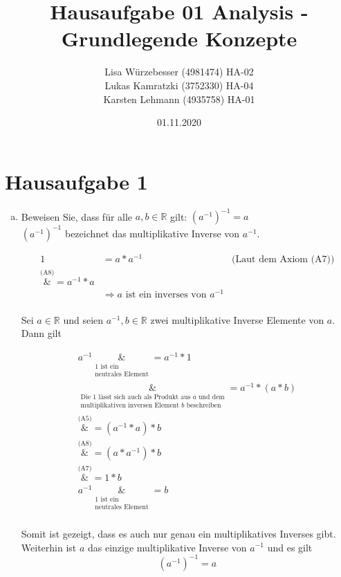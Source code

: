 \documentclass{article}
\author{Lisa Würzebesser (4981474) HA-02 \\ Lukas Kamratzki (3752330) HA-04 \\ Karsten Lehmann (4935758) HA-01}
\date{01.11.2020}
\title{Hausaufgabe 01 Analysis - Grundlegende Konzepte}
\begin{document}
\maketitle
\newpage

\section*{Hausaufgabe 1}

\begin{enumerate}[(a)]
\item Beweisen Sie, dass für alle $a, b \in \mathbb{R}$ gilt: $(a^{-1})^{-1} = a$ \\

  $(a^{-1})^{-1}$ bezeichnet das multiplikative Inverse von $a^{-1}$.

  \begin{align*}
    1  &= a * a^{-1}  &\text{(Laut dem Axiom (A7))}\\
       \overset{\text{(A8)}}&{=} a^{-1} * a  \\
       &\Rightarrow a \text{ ist ein inverses von } a^{-1}
  \end{align*}
  \\
  Sei $a \in \mathbb{R}$ und seien $a^{-1}, b \in \mathbb{R}$ zwei multiplikative Inverse Elemente von $a$.
  Dann gilt

  \begin{align*}
    a^{-1} \underset{\substack{1 \text{ ist ein} \\ \text{neutrales Element}}}&{=} a^{-1} * 1 \\
           \underset{\substack{\text{Die } 1 \text{ lässt sich auch als Produkt aus } a \text{ und dem}\\ \text{multiplikativen inversen Element } b \text{ beschreiben}}}&{=} a^{-1} * (a * b) \\
           \overset{\text{(A5)}}&{=} (a^{-1} * a) * b \\
           \overset{\text{(A8)}}&{=} (a * a^{-1}) * b \\
           \overset{\text{(A7)}}&{=} 1 * b \\
    a^{-1} \underset{\substack{1 \text{ ist ein} \\ \text{neutrales Element}}}&{=} b \\
  \end{align*}

  Somit ist gezeigt, dass es auch nur genau ein multiplikatives Inverses gibt. Weiterhin ist $a$ das einzige multiplikative Inverse von $a^{-1}$ und es gilt
  \[
    (a^{-1})^{-1} = a
  \]


\end{enumerate}
\end{document}
